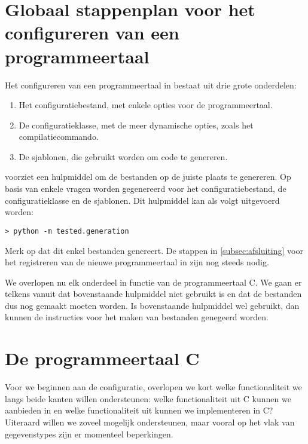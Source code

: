 \section{Globaal stappenplan voor het configureren van een programmeertaal}\label{sec:globaal-stappenplan-voor-het-configureren}

Het configureren van een programmeertaal in \tested{} bestaat uit drie grote onderdelen:

\begin{enumerate}
    \item Het configuratiebestand, met enkele opties voor de programmeertaal.
    \item De configuratieklasse, met de meer dynamische opties, zoals het compilatiecommando.
    \item De sjablonen, die gebruikt worden om code te genereren.
\end{enumerate}

\tested{} voorziet een hulpmiddel om de bestanden op de juiste plaats te genereren.
Op basis van enkele vragen worden  gegenereerd voor het configuratiebestand, de configuratieklasse en de sjablonen.
Dit hulpmiddel kan als volgt uitgevoerd worden:

\begin{verbatim}
> python -m tested.generation
\end{verbatim}

Merk op dat dit enkel bestanden genereert.
De stappen in \cref{subsec:afsluiting} voor het registreren van de nieuwe programmeertaal in \tested{} zijn nog steeds nodig.

We overlopen nu elk onderdeel in functie van de programmeertaal C\@.
We gaan er telkens vanuit dat bovenstaande hulpmiddel niet gebruikt is en dat de bestanden dus nog gemaakt moeten worden.
Is bovenstaande hulpmiddel wel gebruikt, dan kunnen de instructies voor het maken van bestanden genegeerd worden.

\section{De programmeertaal C}\label{sec:de-programmeertaal-c}

Voor we beginnen aan de configuratie, overlopen we kort welke functionaliteit we langs beide kanten willen ondersteunen: welke functionaliteit uit C kunnen we aanbieden in \tested{} en welke functionaliteit uit \tested{} kunnen we implementeren in C?
Uiteraard willen we zoveel mogelijk ondersteunen, maar vooral op het vlak van gegevenstypes zijn er momenteel beperkingen.

